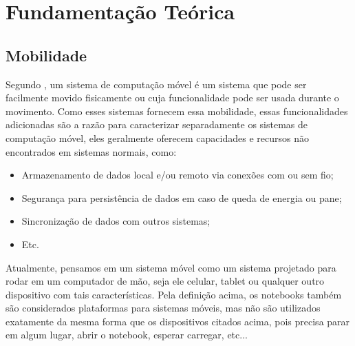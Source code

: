 \chapter{Fundamentação Teórica}

\section{Mobilidade}\label{sec:mobilidade}
Segundo \citet{b2004mobile}, um sistema de computação móvel é um sistema que pode ser facilmente movido fisicamente ou cuja funcionalidade pode ser usada durante o movimento. Como esses sistemas fornecem essa mobilidade, essas funcionalidades adicionadas são a razão para caracterizar separadamente os sistemas de computação móvel, eles geralmente oferecem capacidades e recursos não encontrados em sistemas normais, como: 
 \begin{itemize}
   \item Armazenamento de dados local e/ou remoto via conexões com ou sem fio;
   \item Segurança para persistência de dados em caso de queda de energia ou pane;
   \item Sincronização de dados com outros sistemas;
   \item Etc.
 \end{itemize}

Atualmente, pensamos em um sistema móvel como um sistema projetado para rodar em um computador de mão, seja ele celular, tablet ou qualquer outro dispositivo com tais características. Pela definição acima, os notebooks também são considerados plataformas para sistemas móveis, mas não são utilizados exatamente da mesma forma que os dispositivos citados acima, pois precisa parar em algum lugar, abrir o notebook, esperar carregar, etc...

